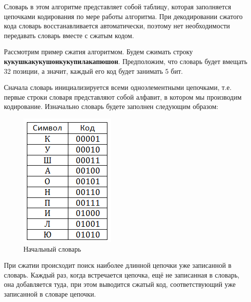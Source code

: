 Словарь в этом алгоритме представляет собой таблицу, которая заполняется цепочками кодирования по мере работы алгоритма. При декодировании сжатого кода словарь восстанавливается автоматически, поэтому нет необходимости передавать словарь вместе с сжатым кодом. 

Рассмотрим пример сжатия алгоритмом. Будем сжимать строку \textbf{кукушкакукушонкукупилакапюшон}. Предположим, что словарь будет вмещать 32 позиции, а значит, каждый его код будет занимать 5 бит.

Сначала словарь инициализируется всеми одноэлементными цепочками, т.е. первые строки словаря представляют собой алфавит, в котором мы производим кодирование. Изначально словарь будете заполнен следующим образом:

\begin{figure}[H]
	\begin{center}
		\includegraphics[scale=1]{pics/LZW/dictionary.png}
		\caption{Начальный словарь} 
		\label{pic:lzw:dictionary}
	\end{center}
\end{figure}

При сжатии происходит поиск наиболее длинной цепочки уже записанной в словарь. Каждый раз, когда встречается цепочка, ещё не записанная в словарь, она добавляется туда, при этом выводится сжатый код, соответствующий уже записанной в словаре цепочки.

